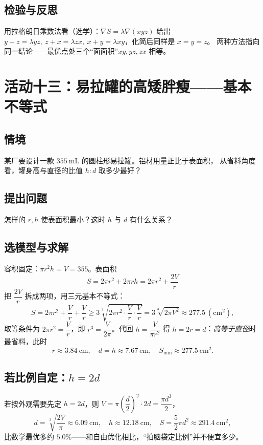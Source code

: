 \subsection{检验与反思}
用拉格朗日乘数法看（选学）：$\nabla S=\lambda\nabla(xyz)$ 给出
$y+z=\lambda yz,\ z+x=\lambda zx,\ x+y=\lambda xy$，化简后同样是 $x=y=z$。
两种方法指向同一结论——最优点处三个“面面积”$xy,yz,zx$ 相等。

\section{活动十三：易拉罐的高矮胖瘦——基本不等式}

\subsection{情境}
某厂要设计一款 $355\ \mathrm{mL}$ 的圆柱形易拉罐。铝材用量正比于表面积，
从省料角度看，罐身高与直径的比值 $h:d$ 取多少最好？

\subsection{提出问题}
怎样的 $r,h$ 使表面积最小？这时 $h$ 与 $d$ 有什么关系？

\subsection{选模型与求解}
容积固定：$\pi r^2h=V=355$。表面积
\[
  S=2\pi r^2+2\pi rh=2\pi r^2+\frac{2V}{r}
\]
把 $\dfrac{2V}{r}$ 拆成两项，用三元基本不等式：
\[
  S=2\pi r^2+\frac{V}{r}+\frac{V}{r}
   \ge 3\sqrt[3]{2\pi r^2\cdot\frac{V}{r}\cdot\frac{V}{r}}
   =3\sqrt[3]{2\pi V^2}\approx 277.5\ (\mathrm{cm^2}),
\]
取等条件为 $2\pi r^2=\dfrac{V}{r}$，即 $r^3=\dfrac{V}{2\pi}$。代回 $h=\dfrac{V}{\pi r^2}$
得 $h=2r=d$：\emph{高等于直径}时最省料，此时
\[
  r\approx 3.84\ \mathrm{cm},\quad d=h\approx 7.67\ \mathrm{cm},\quad S_{\min}\approx 277.5\ \mathrm{cm^2}.
\]

\subsection{若比例自定：$h=2d$}
若按外观需要先定 $h=2d$，则 $V=\pi\left(\dfrac d2\right)^2\cdot 2d=\dfrac{\pi d^3}{2}$，
\[
  d=\sqrt[3]{\frac{2V}{\pi}}\approx 6.09\ \mathrm{cm},\quad h\approx 12.18\ \mathrm{cm},
  \quad S=\frac52\pi d^2\approx 291.4\ \mathrm{cm^2},
\]
比数学最优多约 $5.0\%$——和自由优化相比，“拍脑袋定比例”并不便宜多少。


